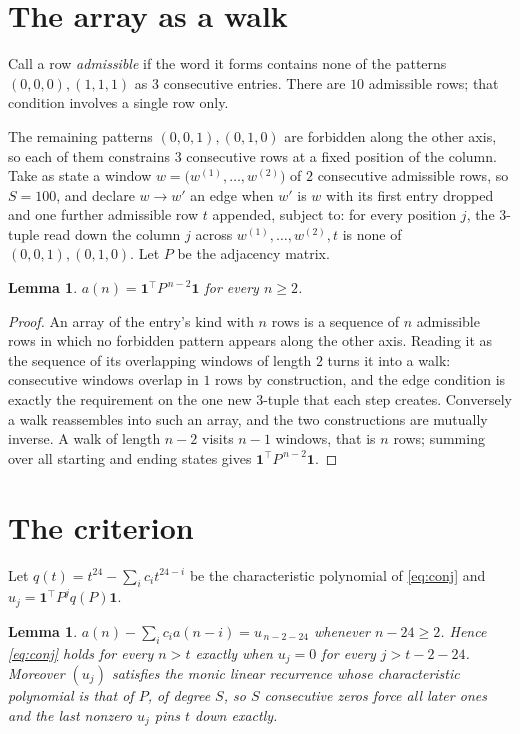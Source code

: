 \documentclass[11pt,a4paper]{article}
\theoremstyle{plain}
\newtheorem{lemma}[theorem]{Lemma}
\theoremstyle{definition}
\begin{document}
\section{The array as a walk}

Call a row \emph{admissible} if the word it forms contains none of the patterns
$(0,0,0), (1,1,1)$ as $3$ consecutive entries. There are $10$ admissible rows; that condition
involves a single row only.

The remaining patterns $(0,0,1), (0,1,0)$ are forbidden along the other axis, so each of them
constrains $3$ consecutive rows at a fixed position of the column. Take as state a
window $w=\bigl(w^{(1)},\dots,w^{(2)}\bigr)$ of $2$ consecutive admissible
rows, so $S=100$, and declare $w\to w'$ an edge when $w'$ is $w$ with its first entry
dropped and one further admissible row $t$ appended, subject to: for every position
$j$, the $3$-tuple read down the column $j$ across $w^{(1)},\dots,w^{(2)},t$
is none of $(0,0,1), (0,1,0)$. Let $P$ be the adjacency matrix.

\begin{lemma}\label{lem:walk}
$a(n)=\mathbf{1}^{\!\top}P^{\,n-2}\mathbf{1}$ for every $n\ge2$.
\end{lemma}

\begin{proof}
An array of the entry's kind with $n$ rows is a sequence of $n$ admissible rows in
which no forbidden pattern appears along the other axis. Reading it as the sequence of its
overlapping windows of length $2$ turns it into a walk: consecutive windows overlap in
$1$ rows by construction, and the edge condition is exactly the requirement on the one
new $3$-tuple that each step creates. Conversely a walk reassembles into such an array,
and the two constructions are mutually inverse. A walk of length $n-2$ visits $n-1$
windows, that is $n$ rows; summing over all starting and ending states gives
$\mathbf{1}^{\!\top}P^{\,n-2}\mathbf{1}$.
\end{proof}

\section{The criterion}

Let $q(t)=t^{24}-\sum_i c_i t^{24-i}$ be the characteristic polynomial of
\eqref{eq:conj} and $u_j=\mathbf{1}^{\!\top}P^{j}q(P)\mathbf{1}$.

\begin{lemma}\label{lem:crit}
$a(n)-\sum_i c_i a(n-i)=u_{\,n-2-24}$ whenever $n-24\ge2$. Hence
\eqref{eq:conj} holds for every $n>t$ exactly when $u_j=0$ for every
$j>t-2-24$. Moreover $(u_j)$ satisfies the monic linear recurrence whose
characteristic polynomial is that of $P$, of degree $S$, so $S$ consecutive zeros force all
later ones and the last nonzero $u_j$ pins $t$ down exactly.
\end{lemma}
\end{document}
